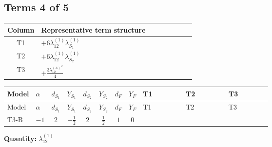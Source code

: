 \documentclass[8pt]{article}
\begin{document}
\begin{landscape}
\subsection*{Terms 4 of 5}
\begin{center}
\begin{tabular}{@{}c >{\raggedright\arraybackslash}p{0.82\linewidth}@{}}
\toprule
Column & Representative term structure \\
\midrule
T1 & \(\displaystyle +6 {\lambda_{12}^{(1)}} {\lambda_{S_1}^{(1)}}\) \\
\midrule
T2 & \(\displaystyle +6 {\lambda_{12}^{(1)}} {\lambda_{S_2}^{(1)}}\) \\
\midrule
T3 & \(\displaystyle +\frac{3 {\lambda_{12}^{(A)}}^2}{4}\) \\
\midrule
\bottomrule
\end{tabular}
\end{center}
\smallskip
\tiny
\begin{longtable}{@{}llcccccc >{\raggedright\arraybackslash}p{0.21\linewidth} >{\raggedright\arraybackslash}p{0.21\linewidth} >{\raggedright\arraybackslash}p{0.21\linewidth}@{}}
\toprule
Model & $\alpha$ & $d_{S_1}$ & $Y_{S_1}$ & $d_{S_2}$ & $Y_{S_2}$ & $d_F$ & $Y_F$ & T1 & T2 & T3 \\
\midrule
\endfirsthead
\toprule
Model & $\alpha$ & $d_{S_1}$ & $Y_{S_1}$ & $d_{S_2}$ & $Y_{S_2}$ & $d_F$ & $Y_F$ & T1 & T2 & T3 \\
\midrule
\endhead
T3-B & $-1$ & $2$ & $-\frac{1}{2}$ & $2$ & $\frac{1}{2}$ & $1$ & $0$ & \scriptsize\adjustbox{max width=\linewidth}{$\begin{gathered} +6 {\lambda_{12}^{(1)}} {\lambda_{S_1}^{(1)}}\end{gathered}$} & \scriptsize\adjustbox{max width=\linewidth}{$\begin{gathered} +6 {\lambda_{12}^{(1)}} {\lambda_{S_2}^{(1)}}\end{gathered}$} & \scriptsize\adjustbox{max width=\linewidth}{$\begin{gathered} +\frac{3 {\lambda_{12}^{(A)}}^2}{4}\end{gathered}$} \\
\midrule
\bottomrule
\end{longtable}
\clearpage
\noindent\textbf{Quantity: }$\lambda_{12}^{(1)}$\par\smallskip

\end{landscape}
\end{document}
